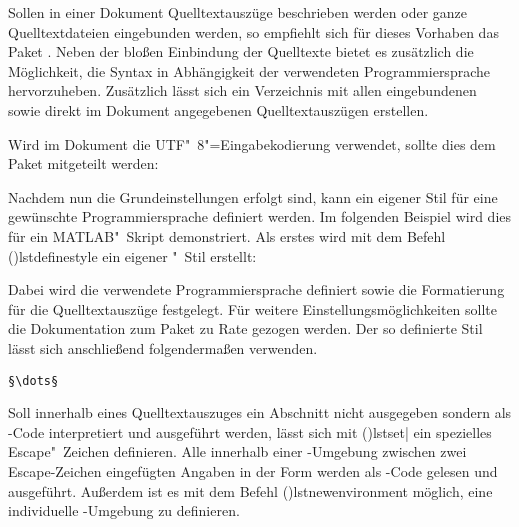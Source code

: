 \documentclass[%
  english,ngerman,%
  cdgeometry=no,DIV=12,%
  cd=false,cdfont=false,cdtitle=true,%
  headings=normal,%
  automark,%
  listof=toc,%
]{tudscrartcl}
\begin{document}
Sollen in einer Dokument Quelltextauszüge beschrieben werden oder ganze 
Quelltextdateien eingebunden werden, so empfiehlt sich für dieses Vorhaben das 
Paket . Neben der bloßen Einbindung der Quelltexte bietet es 
zusätzlich die Möglichkeit, die Syntax in Abhängigkeit der verwendeten 
Programmiersprache hervorzuheben. Zusätzlich lässt sich ein Verzeichnis mit 
allen eingebundenen sowie direkt im Dokument angegebenen Quelltextauszügen 
erstellen.
%
\begin{Hint}
\usepackage{listings}
\end{Hint}
%
Wird im Dokument die UTF"~8"=Eingabekodierung verwendet, sollte dies dem Paket 
mitgeteilt werden:
%
\begin{Hint}
\end{Hint}
%
Nachdem nun die Grundeinstellungen erfolgt sind, kann ein eigener Stil für eine 
gewünschte Programmiersprache definiert werden. Im folgenden Beispiel wird dies 
für ein MATLAB"~Skript demonstriert. Als erstes wird mit dem Befehl 
\Macro(){lstdefinestyle} ein eigener "~Stil 
erstellt:
%
\begin{Hint*}
\end{Hint*}
%
Dabei wird die verwendete Programmiersprache definiert sowie die Formatierung 
für die Quelltextauszüge festgelegt. Für weitere Einstellungsmöglichkeiten 
sollte die Dokumentation zum Paket zu Rate gezogen werden. Der so definierte 
Stil lässt sich anschließend folgendermaßen verwenden.
%
\begin{Hint}
\begin{lstlisting}[style=matlab]
§\dots§
\end{lstlisting}
\end{Hint}
%
Soll innerhalb eines Quelltextauszuges ein Abschnitt nicht ausgegeben sondern 
als -Code interpretiert und ausgeführt werden, lässt sich mit 
\Macro(){lstset|}
ein spezielles Escape"~Zeichen definieren. Alle innerhalb einer 
-Umgebung zwischen zwei Escape-Zeichen eingefügten Angaben in 
der Form \PValue{\dots} werden als 
-Code gelesen und ausgeführt. Außerdem ist es mit dem Befehl 
\Macro(){lstnewenvironment} möglich, eine individuelle 
-Umgebung zu definieren.
\end{document}
